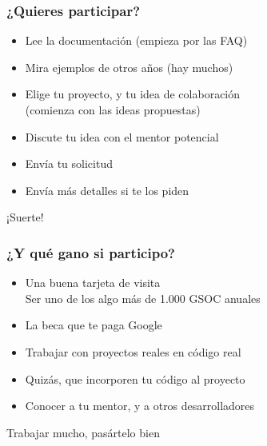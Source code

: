 \begin{frame}
\frametitle{¿Quieres participar?}

{\Large

\begin{itemize}
\item Lee la documentación (empieza por las FAQ)
\item Mira ejemplos de otros años (hay muchos)
\item Elige tu proyecto, y tu idea de colaboración \\
  (comienza con las ideas propuestas)
\item Discute tu idea con el mentor potencial
\item Envía tu solicitud
\item Envía más detalles si te los piden
\end{itemize}

\begin{center}
¡Suerte!
\end{center}
}

\end{frame}

\begin{frame}
\frametitle{¿Y qué gano si participo?}

{\Large

\begin{itemize}
\item Una buena tarjeta de visita \\
  Ser uno de los algo más de 1.000 GSOC anuales
\item La beca que te paga Google
\item Trabajar con proyectos reales en código real
\item Quizás, que incorporen tu código al proyecto
\item Conocer a tu mentor, y a otros desarrolladores
\end{itemize}

\begin{center}
Trabajar mucho, pasártelo bien
\end{center}
}

\end{frame}


